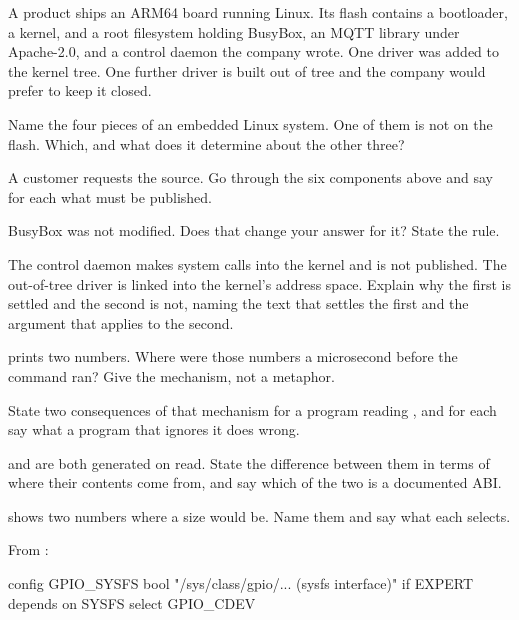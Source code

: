 A product ships an ARM64 board running Linux. Its flash contains a bootloader, a kernel, and a root
filesystem holding BusyBox, an MQTT library under Apache-2.0, and a control daemon the company
wrote. One driver was added to the kernel tree. One further driver is built out of tree and the
company would prefer to keep it closed.

 Name the four pieces of an embedded Linux system. One of them is not on the flash. Which,
and what does it determine about the other three? 

 A customer requests the source. Go through the six components above and say for each what
must be published. 

 BusyBox was not modified. Does that change your answer for it? State the rule. 

 The control daemon makes system calls into the kernel and is not published. The
out-of-tree driver is linked into the kernel's address space. Explain why the first is settled and
the second is not, naming the text that settles the first and the argument that applies to the
second. 

\label{exa:q:2}

  prints two numbers. Where were those numbers a microsecond before
the command ran? Give the mechanism, not a metaphor. 

 State two consequences of that mechanism for a program reading , and for each
say what a program that ignores it does wrong. 

  and  are both generated on read. State the difference between them
in terms of where their contents come from, and say which of the two is a documented ABI. 

  shows two numbers where a size would be. Name them and say what
each selects. 

\label{exa:q:3}

From :

\begin{console}
config GPIO_SYSFS
	bool "/sys/class/gpio/... (sysfs interface)" if EXPERT
	depends on SYSFS
	select GPIO_CDEV
\end{console}

